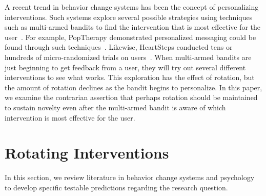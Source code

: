 A recent trend in behavior change systems has been the concept of personalizing interventions. Such systems explore several possible strategies using techniques such as multi-armed bandits to find the intervention that is most effective for the user~\cite{paredes2014poptherapy, rabbi2014automated}. For example, PopTherapy demonstrated personalized messaging could be found through such techniques~\cite{paredes2014poptherapy}. Likewise, HeartSteps conducted tens or hundreds of micro-randomized trials on users~\cite{doi:10.1111/j.1740-9713.2015.00863.x}.  When multi-armed bandits are just beginning to get feedback from a user, they will try out several different interventions to see what works. This exploration has the effect of rotation, but the amount of rotation declines as the bandit begins to personalize. In this paper, we examine the contrarian assertion that perhaps rotation should be maintained to sustain novelty even after the multi-armed bandit is aware of which intervention is most effective for the user.



\section{Rotating Interventions}

In this section, we review literature in behavior change systems and psychology to develop specific testable predictions regarding the research question.%

